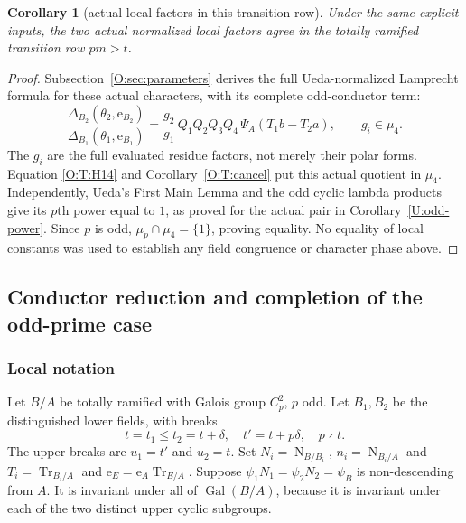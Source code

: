 \documentclass[11pt]{amsart}
\newtheorem{corollary}[theorem]{Corollary}
\theoremstyle{definition}
\theoremstyle{remark}
\newcommand{\Tr}{\operatorname{Tr}}
\newcommand{\Nm}{\operatorname{N}}
\newcommand{\Gal}{\operatorname{Gal}}
\newcommand{\ee}{\mathrm e}\newcommand{\echar}{\mathrm e}\newcommand{\FF}{\mathbf F}
\begin{document}
\begin{corollary}[actual local factors in this transition row]\label{O:T:actual-local-factors}
Under the same explicit inputs, the two actual normalized local
factors agree in the totally ramified transition row $pm>t$.
\end{corollary}
\begin{proof}
Subsection~\ref{O:sec:parameters} derives the full Ueda-normalized Lamprecht formula for
these actual characters, with its complete odd-conductor term:
\[
 \frac{\Delta_{B_2}(\theta_2,\ee_{B_2})}
      {\Delta_{B_1}(\theta_1,\ee_{B_1})}
 =\frac{g_2}{g_1}\,Q_1Q_2Q_3Q_4\,
   \Psi_A(T_1b-T_2a),\qquad g_i\in\mu_4.
\]
The $g_i$ are the full evaluated residue factors, not merely their
polar forms. Equation \eqref{O:T:H14} and Corollary~\ref{O:T:cancel} put
this actual quotient in $\mu_4$. Independently, Ueda's First Main
Lemma and the odd cyclic lambda products give its $p$th power equal
to $1$, as proved for the actual pair in Corollary~\ref{U:odd-power}.
Since $p$ is odd, $\mu_p\cap\mu_4=\{1\}$, proving equality.
No equality of local constants was used to establish any field
congruence or character phase above.
\end{proof}


\subsection{Conductor reduction and completion of the odd-prime case}\label{O:sec:total}
\subsubsection*{Local notation}
Let $B/A$ be totally ramified with Galois group $C_p^2$, $p$ odd.
Let $B_1,B_2$ be the distinguished lower fields, with breaks
\[
 t=t_1\le t_2=t+\delta,\quad t'=t+p\delta,\quad p\nmid t.
\]
The upper breaks are $u_1=t'$ and $u_2=t$.
Set $N_i=\Nm_{B/B_i}$, $n_i=\Nm_{B_i/A}$ and
$T_i=\Tr_{B_i/A}$ and $\ee_E=\ee_A\Tr_{E/A}$.
Suppose $\psi_1N_1=\psi_2N_2=\psi_B$ is non-descending from $A$.
It is invariant under all of $\Gal(B/A)$, because it is invariant
under each of the two distinct upper cyclic subgroups.
\end{document}
